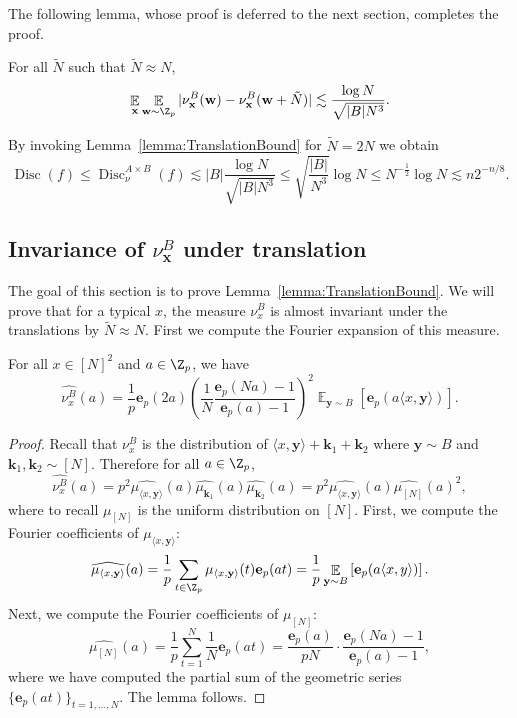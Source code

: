 \documentclass{toc}
\DeclareMathOperator{\Ex}{{\mathbb E}}
\DeclareMathOperator{\Disc}{Disc}
\newcommand{\e}{\mathbf{e}}
\newcommand{\x}{\mathbf{x}}
\newcommand{\y}{\mathbf{y}}
\newcommand{\w}{\mathbf{w}}
\newcommand{\Bk}{\mathbf{k}}   %
\newcommand{\ip}[1]{\langle #1 \rangle}
\begin{document}
 The following lemma, whose proof is deferred to the next section, completes the proof.
 \begin{lemma}\label{lemma:TranslationBound}
	For all $\tilde{N}$ such that $\tilde{N}\approx N$, $$ \Ex_\x  \Ex_{\w \sim \Z_p} |\nu_{\x}^B(\w) -\nu_{\x}^B(\w+\tilde{N})|\lesssim \frac{\log N}{\sqrt{|B|N^3}}.$$
\end{lemma}

	By invoking Lemma~\ref{lemma:TranslationBound} for $\tilde{N}=2N$ we obtain
%
	$$ \Disc(f) \leq \Disc^{A \times B}_\nu(f) \lesssim  |B| \frac{\log N  }{\sqrt{|B|N^3}}\leq \sqrt{\frac{|B|}{N^3}}\log N \leq N^{-\frac{1}{2}}\log N \lesssim n 2^{-n/8}.$$


\subsection{Invariance of $\nu^B_\x$ under translation}
The goal of this section is to prove Lemma~\ref{lemma:TranslationBound}.
We will prove that for a typical $x$, the measure $\nu^B_x$ is almost invariant under the translations by  $\tilde{N} \approx N$. First we compute the Fourier  expansion of this measure.

\begin{lemma}\label{lemma:fouriercoeffs}
	For all $x \in [N]^2$ and $a\in \Z_p$, we have
	$$\widehat{\nu^B_x}(a) =  \frac{1}{p} \e_p(2a)   \left(\frac{1}{N} \frac{\e_p(Na)-1}{\e_p(a)-1}\right)^2   \Ex_{\y \sim B}   \left[ \e_p(a\ip{x,\y})\right].
	$$
\end{lemma}
\begin{proof}
	Recall that $\nu^B_x$ is the distribution of $\ip{x,\y}+\Bk_1+\Bk_2$ where $\y\sim B$ and $\Bk_1,\Bk_2\sim [N]$. Therefore for all $a\in \Z_p$,
	$$\widehat{\nu^B_x}(a) = p^2\widehat{\mu_{\ip{x,\y}}}(a)\widehat{\mu_{\Bk_1}}(a)\widehat{\mu_{\Bk_2}}(a) =  p^2\widehat{\mu_{\ip{x,\y}}}(a)\widehat{\mu_{[N]}}(a)^2,$$
	where to recall $\mu_{[N]}$ is the uniform distribution on $[N]$. First, we compute the Fourier coefficients of $\mu_{\ip{x,\y}}$:
	$$
		\widehat{\mu_{\ip{x,\y}}}(a) = \frac{1}{p}\sum_{t \in \Z_p} \mu_{\ip{x,\y}}(t) \e_p(at)= \frac{1}{p}  \Ex_{\y \sim B} \left[\e_p(a\ip{x,y})\right].
$$
Next, we compute the Fourier coefficients of $\mu_{[N]}$:
	$$\widehat{\mu_{[N]}}(a) =  \frac{1}{p}  \sum_{t=1}^{N} \frac{1}{N} \e_p(at) = \frac{\e_p(a)}{pN} \cdot \frac{\e_p(Na)-1}{\e_p(a)-1},$$
	where we have computed the partial sum of the geometric series $\{\e_p(at)\}_{t=1,\ldots,N}$.
The lemma follows. 
\end{proof}
\end{document}
